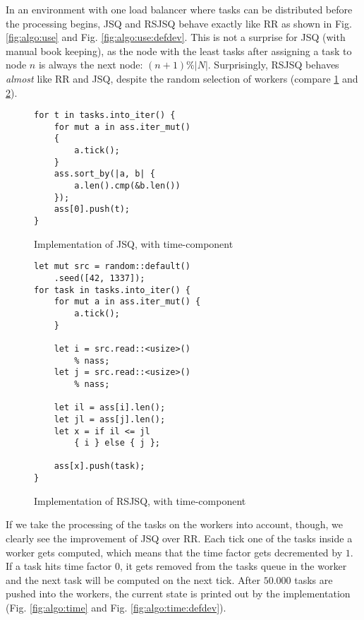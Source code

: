 In an environment with one load balancer where tasks can be distributed before
the processing begins, \ac{JSQ} and \ac{RSJSQ} behave exactly like \ac{RR} as
shown in Fig. \ref{fig:algo:use} and Fig. \ref{fig:algo:use:defdev}.
This is not a surprise for \ac{JSQ} (with manual book keeping), as the node with
the least tasks after assigning a task to node $n$ is always the next node:
$(n + 1) \% |N|$.
Surprisingly, \ac{RSJSQ} behaves \emph{almost} like \ac{RR} and \ac{JSQ},
despite the random selection of workers
(compare \ref{lst:jsq} and \ref{lst:rsjsq}).

\begin{figure}[]
	\begin{verbatim}
for t in tasks.into_iter() {
    for mut a in ass.iter_mut()
    {
        a.tick();
    }
    ass.sort_by(|a, b| {
        a.len().cmp(&b.len())
    });
    ass[0].push(t);
}
	\end{verbatim}
    \caption{Implementation of \ac{JSQ}, with time-component}
    \label{lst:jsq}
\end{figure}

\begin{figure}[b!]
	\begin{verbatim}
let mut src = random::default()
    .seed([42, 1337]);
for task in tasks.into_iter() {
    for mut a in ass.iter_mut() {
        a.tick();
    }

    let i = src.read::<usize>()
        % nass;
    let j = src.read::<usize>()
        % nass;

    let il = ass[i].len();
    let jl = ass[j].len();
    let x = if il <= jl
        { i } else { j };

    ass[x].push(task);
}
	\end{verbatim}
    \caption{Implementation of \ac{RSJSQ}, with time-component}
    \label{lst:rsjsq}
\end{figure}

If we take the processing of the tasks on the workers into account, though, we
clearly see the improvement of \ac{JSQ} over \ac{RR}.
Each tick one of the tasks inside a worker gets computed, which means that
the time factor gets decremented by $1$.
If a task hits time factor $0$, it gets removed from the tasks queue in the
worker and the next task will be computed on the next tick.
After $50.000$ tasks are pushed into the workers, the current state is printed
out by the implementation (Fig. \ref{fig:algo:time} and
Fig. \ref{fig:algo:time:defdev}).


